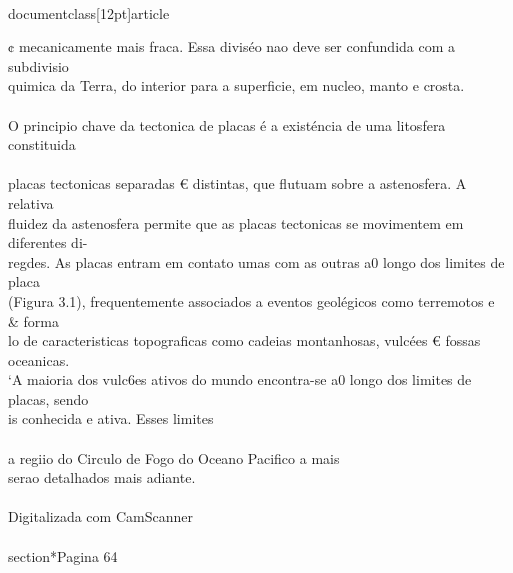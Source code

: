 \\documentclass[12pt]{article}
\begin{document}
¢ mecanicamente mais fraca. Essa diviséo nao deve ser confundida com a subdivisio\\
quimica da Terra, do interior para a superficie, em nucleo, manto e crosta.\\
\\
O principio chave da tectonica de placas é a existéncia de uma litosfera constituida\\
\\
placas tectonicas separadas € distintas, que flutuam sobre a astenosfera. A relativa\\
fluidez da astenosfera permite que as placas tectonicas se movimentem em diferentes di-\\
regdes. As placas entram em contato umas com as outras a0 longo dos limites de placa\\
(Figura 3.1), frequentemente associados a eventos geolégicos como terremotos e \\& forma\\
lo de caracteristicas topograficas como cadeias montanhosas, vulcées € fossas oceanicas.\\
‘A maioria dos vulc6es ativos do mundo encontra-se a0 longo dos limites de placas, sendo\\
is conhecida e ativa. Esses limites\\
\\
a regiio do Circulo de Fogo do Oceano Pacifico a mais\\
serao detalhados mais adiante.\\
\\
Digitalizada com CamScanner\\

\\section*{Pagina 64}
\end{document}
